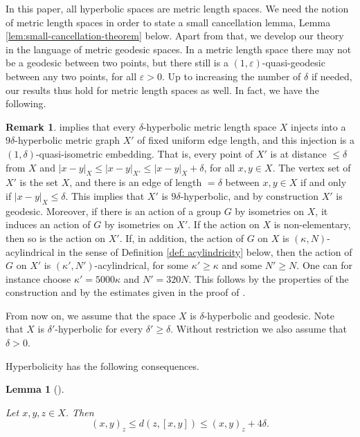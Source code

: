\documentclass[leqno,a4paper,10pt]{amsart}
\theoremstyle{plain}
\newtheorem{lem}[thm]{Lemma}
\theoremstyle{definition}
\newtheorem{rem}[thm]{Remark}
\theoremstyle{remark}
\renewcommand{\leq}{\leqslant}
\let\le\leqslant
\let\ge\geqslant
\let\leq\leqslant
\begin{document}
In this paper, all hyperbolic spaces are metric length spaces. We need the notion of metric length spaces in order to state a small cancellation lemma, Lemma \ref{lem:small-cancellation-theorem} below. Apart from that, we develop our theory in the language of metric geodesic spaces. In a metric length space there may not be a geodesic between two points, but there still is a $(1,\varepsilon)$-quasi-geodesic between any two points, for all $\varepsilon >0$. Up to increasing the number of $\delta$ if needed, our results thus hold for metric length spaces as well. In fact, we have the following. 

 \begin{rem}\label{R:geodesic} \cite[Lemma 5.34]{dahmani_hyperbolically_2017} implies that every $\delta$-hyperbolic metric length space $X$ injects into a $9\delta$-hyperbolic metric graph $X'$ of fixed uniform edge length, and this injection is a $(1,\delta)$-quasi-isometric embedding. That is, every point of $X'$ is at distance $\leq \delta$ from $X$ and $|x-y|_X\leqslant |x-y|_{X'}\leqslant |x-y|_X+\delta$, for all $x,y\in X$. The vertex set of $X'$ is the set $X$, and there is an edge of length $=\delta$ between $x,y\in X$ if and only if $|x-y|_X\leqslant \delta$. This implies that $X'$ is $9\delta$-hyperbolic, and by construction $X'$ is geodesic. Moreover, if there is an action of a group $G$ by isometries on $X$, it induces an action of $G$ by isometries on $X'$. If the action on $X$ is non-elementary, then so is the action on $X'$. If, in addition, the action of $G$ on $X$ is $(\kappa,N)$-acylindrical in the sense of Definition \ref{def: acylindricity} below, then the action of $G$ on $X'$ is $(\kappa',N')$-acylindrical, for some $\kappa'\geqslant\kappa$ and some $N'\geqslant N$. One can for instance choose $\kappa'=5000\kappa$ and $N'=320 N$. This follows by the properties of the construction and by the estimates given in the proof of \cite[Proposition 5.31]{dahmani_hyperbolically_2017}.
\end{rem}

From now on, we assume that the space $X$ is $\delta$-hyperbolic and geodesic.  
Note that $X$ is $\delta'$-hyperbolic for every $\delta' \ge \delta$. Without restriction  we also assume that $\delta >0$. 


 Hyperbolicity has the following consequences.

\begin{lem}[]
	 
	\label{lem:projections-gromov-product}
	
	Let $x,y,z\in X$. Then
	$$
	(x,y)_z \le d(z,[x,y]) \le (x,y)_z+4\delta.
	$$
	
\end{lem}
\end{document}

